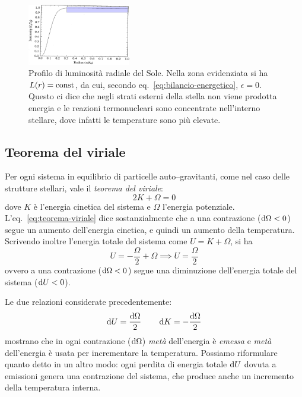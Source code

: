 \begin{figure}
\centering
\includegraphics[width=0.4\textwidth]{immagini/profilo-luminosita-radiale-sole.png}
\caption{Profilo di luminosità radiale del Sole. Nella zona evidenziata si ha $L(r) = \textup{const}$, da cui, secondo eq.~\eqref{eq:bilancio-energetico}, $\epsilon = 0$. Questo ci dice che negli strati esterni della stella non viene prodotta energia e le reazioni termonucleari sono concentrate nell'interno stellare, dove infatti le temperature sono più elevate.}
\label{fig:profilo-luminosità-sole}
\end{figure}

\subsection{Teorema del viriale}
Per ogni sistema in equilibrio di particelle auto--gravitanti, come nel caso delle strutture stellari, vale il \emph{teorema del viriale}:
\begin{equation}\label{eq:teorema-viriale}
    2K + \Omega = 0
\end{equation}
dove $K$ è l'energia cinetica del sistema e $\Omega$ l'energia potenziale. L'eq.~\eqref{eq:teorema-viriale} dice sostanzialmente che a una contrazione ($\mathop{\mathrm{{}d}}\mathopen{} \Omega < 0$) segue un aumento dell'energia cinetica, e quindi un aumento della temperatura. Scrivendo inoltre l'energia totale del sistema come $U = K + \Omega$, si ha
\[
U = - \frac{\Omega}{2} + \Omega \implies U = \frac{\Omega}{2}
\]
ovvero a una contrazione ($\mathop{\mathrm{{}d}}\mathopen{} \Omega < 0$) segue una diminuzione dell'energia totale del sistema ($\mathop{\mathrm{{}d}}\mathopen{} U < 0$).

Le due relazioni considerate precedentemente:
\begin{equation}\label{eq:viriale-differenziale}
\mathop{\mathrm{{}d}}\mathopen{} U = \frac{\mathop{\mathrm{{}d}}\mathopen{} \Omega}{2} \qquad \mathop{\mathrm{{}d}}\mathopen{} K = - \frac{\mathop{\mathrm{{}d}}\mathopen{} \Omega}{2}
\end{equation}
mostrano che in ogni contrazione ($\mathop{\mathrm{{}d}}\mathopen{} \Omega$) \emph{metà} dell'energia è \emph{emessa} e \emph{metà} dell'energia è usata per incrementare la temperatura. Possiamo riformulare quanto detto in un altro modo: ogni perdita di energia totale $\mathop{\mathrm{{}d}}\mathopen{} U$ dovuta a emissioni genera una contrazione del sistema, che produce anche un incremento della temperatura interna.

